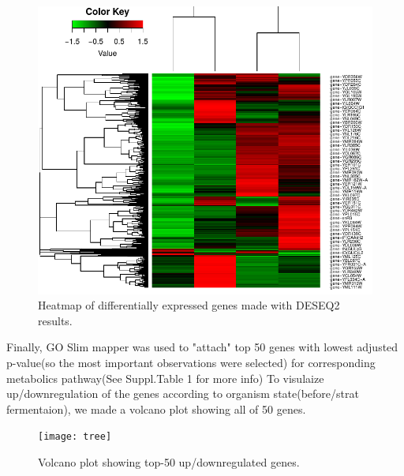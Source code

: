 \documentclass{article}
\begin{document}
 
  \begin{figure}[h]
 	\centering
 	\includegraphics[scale=1.77]{heatmap}  
 	\caption{ Heatmap of differentially expressed genes made with DESEQ2 results.}
 	\label{heatmap}
 \end{figure}
 
 
 Finally, GO Slim mapper was used to "attach" top 50 genes with lowest adjusted p-value(so the most important observations were selected) for corresponding metabolics pathway(See Suppl.Table 1 for more info)
 To visulaize up/downregulation of the genes according to organism state(before/strat fermentaion), we made a volcano plot showing all of 50 genes.
 
 \begin{figure}[h]
	\centering
	\texttt{[image: tree]}  
	\caption{ Volcano plot showing top-50 up/downregulated genes.}
	\label{tree}
\end{figure}
 
\end{document}
